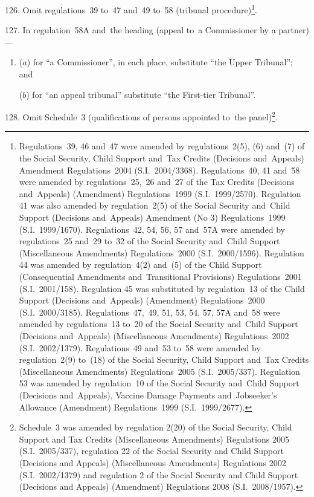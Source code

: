 \documentclass[12pt,a4paper]{article}
\begin{document}
\medskip

126.  Omit regulations~39 to~47 and~49 to~58 (tribunal procedure)\footnote{Regulations~39, 46 and~47 were amended by regulations~2(5), (6) and~(7) of the Social Security, Child Support and~Tax Credits (Decisions and~Appeals) Amendment Regulations~2004 (S.I.~2004/3368). Regulations~40, 41 and~58 were amended by regulations~25,~26 and~27 of the Tax Credits (Decisions and~Appeals) (Amendment) Regulations~1999 (S.I.~1999/2570). Regulation 41 was also amended by regulation~2(5) of the Social Security and~Child Support (Decisions and~Appeals) Amendment (No 3) Regulations~1999 (S.I.~1999/1670). Regulations~42, 54, 56, 57 and~57A were amended by regulations~25 and~29 to~32 of the Social Security and~Child Support (Miscellaneous Amendments) Regulations~2000 (S.I.~2000/1596). Regulation 44 was amended by regulation~4(2) and~(5) of the Child Support (Consequential Amendments and~Transitional Provisions) Regulations~2001 (S.I.~2001/158). Regulation 45 was substituted by regulation~13 of the Child Support (Decisions and~Appeals) (Amendment) Regulations~2000 (S.I.~2000/3185). Regulations~47,~49, 51, 53, 54, 57, 57A and~58 were amended by regulations~13 to~20 of the Social Security and~Child Support (Decisions and~Appeals) (Miscellaneous Amendments) Regulations~2002 (S.I.~2002/1379). Regulations~49 and~53 to~58 were amended by regulation~2(9) to~(18) of the Social Security, Child Support and~Tax Credits (Miscellaneous Amendments) Regulations~2005 (S.I.~2005/337). Regulation 53 was amended by regulation~10 of the Social Security and~Child Support (Decisions and~Appeals), Vaccine Damage Payments and~Jobseeker’s Allowance (Amendment) Regulations~1999 (S.I.~1999/2677).}.

\medskip

127.  In regulation~58A and~the heading (appeal to~a Commissioner by a partner)—
\begin{enumerate}\item[]
($a$) for “a Commissioner”, in each place, substitute “the Upper Tribunal”; and

($b$) for “an appeal tribunal” substitute “the First-tier Tribunal”.
\end{enumerate}

\medskip

128.  Omit Schedule~3 (qualifications of persons appointed to~the panel)\footnote{Schedule~3 was amended by regulation 2(20) of the Social Security, Child Support and Tax Credits (Miscellaneous Amendments) Regulations 2005 (S.I.~2005/337), regulation 22 of the Social Security and Child Support (Decisions and Appeals) (Miscellaneous Amendments) Regulations 2002 (S.I.~2002/1379) and regulation 2 of the Social Security and Child Support (Decisions and Appeals) (Amendment) Regulations 2008 (S.I.~2008/1957).}.
\end{document}
